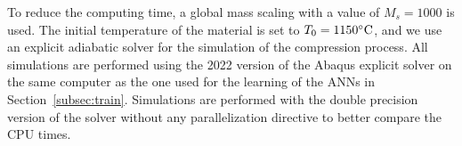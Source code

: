 \documentclass[algorithms,article,submit,pdftex,oneauthors]{Definitions/mdpi}
\DeclareRobustCommand{\mdot}[1]{\accentset{\mbox{\bfseries .}}{#1}}
\DeclareRobustCommand{\ps}{\text{s}^{-1}}
\DeclareRobustCommand{\GPa}{\text{GPa}}
\begin{document}
\textcolor{greencolor}{To reduce the computing time, a global mass scaling with a value of $M_s=1000$ is used.}
The initial temperature of the material is set to $T_{0}=1150\celsius$, and we use an explicit adiabatic solver for the simulation of the compression process.
All simulations are performed using the 2022 version of the Abaqus explicit solver on the same computer as the one used for the learning of the ANNs in Section~\ref{subsec:train}.
Simulations are performed with the double precision version of the solver without any parallelization directive to better compare the CPU times.
\end{document}
